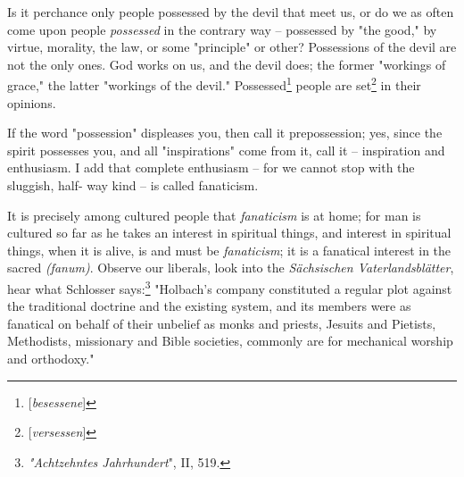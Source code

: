 \documentclass[a4paper]{book}
\begin{document}
Is it perchance only people possessed by the devil that meet us, or do we as 
often come upon people \textit{possessed} in the contrary way -- possessed by 
"{}the good,"{} by virtue, morality, the law, or some "{}principle"{} or 
other? Possessions of the devil are not the only ones. God works on us, and 
the devil does; the former "{}workings of grace,"{} the latter "{}workings of 
the devil."{} Possessed\footnote{[\textit{besessene}]} people are 
set\footnote{[\textit{versessen}]} in their opinions.

If the word "{}possession"{} displeases you, then call it prepossession; yes, 
since the spirit possesses you, and all "{}inspirations"{} come from it, call 
it -- inspiration and enthusiasm. I add that complete enthusiasm -- for we 
cannot stop with the sluggish, half- way kind -- is called fanaticism.

It is precisely among cultured people that \textit{fanaticism} is at home; for 
man is cultured so far as he takes an interest in spiritual things, and 
interest in spiritual things, when it is alive, is and must be 
\textit{fanaticism}; it is a fanatical interest in the sacred 
\textit{(fanum)}. Observe our liberals, look into the \textit{S\"achsischen 
Vaterlandsbl\"atter}, hear what Schlosser 
says:\footnote{\textit{"{}Achtzehntes Jahrhundert}"{}, II, 519.} "{}Holbach's 
company constituted a regular plot against the traditional doctrine and the 
existing system, and its members were as fanatical on behalf of their unbelief 
as monks and priests, Jesuits and Pietists, Methodists, missionary and Bible 
societies, commonly are for mechanical worship and orthodoxy."{}
\end{document}
